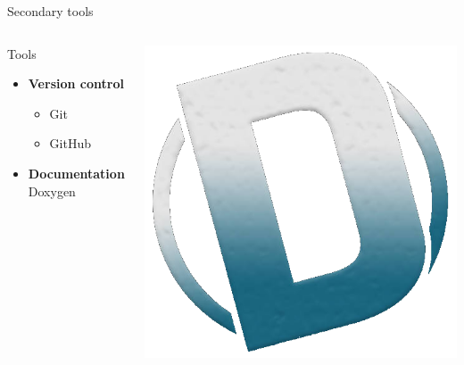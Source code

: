 \begin{frame}{Secondary tools}
    \begin{columns}
        \begin{column}{0.5\textwidth}
            Tools
            \begin{itemize}
                \item \textbf{Version control}
                \begin{itemize}
                    \item Git
                    \item GitHub
                \end{itemize}
                \item \textbf{Documentation} Doxygen
                \end{itemize}
            \end{column}
        \begin{column}{0.5\textwidth}
            \begin{center}
                
                

                \includegraphics[scale=0.1]{./images/doxygen-logo.png}
                \end{center}
        \end{column}
    \end{columns}
\end{frame}

